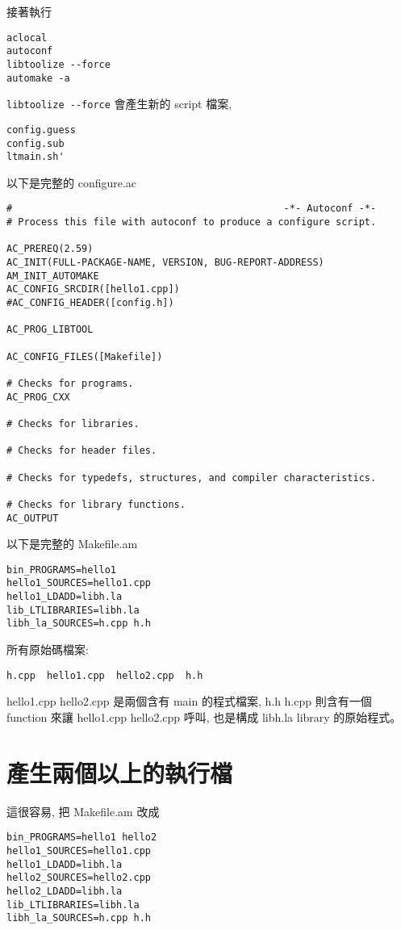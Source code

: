 \documentclass[12pt,a4]{article}
\begin{document}
\begin{CJK}{UTF8}{bsmi}
接著執行
\begin{verbatim}
aclocal
autoconf
libtoolize --force 
automake -a
\end{verbatim}

\verb+libtoolize --force+ 會產生新的 script 檔案,
\begin{verbatim}
config.guess
config.sub
ltmain.sh'
\end{verbatim}

以下是完整的 configure.ac
\begin{verbatim}
#                                               -*- Autoconf -*-
# Process this file with autoconf to produce a configure script.

AC_PREREQ(2.59)
AC_INIT(FULL-PACKAGE-NAME, VERSION, BUG-REPORT-ADDRESS)
AM_INIT_AUTOMAKE
AC_CONFIG_SRCDIR([hello1.cpp])
#AC_CONFIG_HEADER([config.h])

AC_PROG_LIBTOOL

AC_CONFIG_FILES([Makefile])

# Checks for programs.
AC_PROG_CXX

# Checks for libraries.

# Checks for header files.

# Checks for typedefs, structures, and compiler characteristics.

# Checks for library functions.
AC_OUTPUT
\end{verbatim}

以下是完整的 Makefile.am
\begin{verbatim}
bin_PROGRAMS=hello1
hello1_SOURCES=hello1.cpp 
hello1_LDADD=libh.la
lib_LTLIBRARIES=libh.la 
libh_la_SOURCES=h.cpp h.h
\end{verbatim}

所有原始碼檔案:
\begin{verbatim}
h.cpp  hello1.cpp  hello2.cpp  h.h
\end{verbatim}

hello1.cpp hello2.cpp 是兩個含有 main 的程式檔案,
h.h h.cpp 則含有一個 function 來讓 hello1.cpp hello2.cpp 呼叫,
也是構成 libh.la library 的原始程式。

\section{產生兩個以上的執行檔}
這很容易,
把 Makefile.am 改成

\begin{verbatim}
bin_PROGRAMS=hello1 hello2
hello1_SOURCES=hello1.cpp 
hello1_LDADD=libh.la
hello2_SOURCES=hello2.cpp 
hello2_LDADD=libh.la
lib_LTLIBRARIES=libh.la 
libh_la_SOURCES=h.cpp h.h
\end{verbatim}


\end{CJK}
\end{document}
